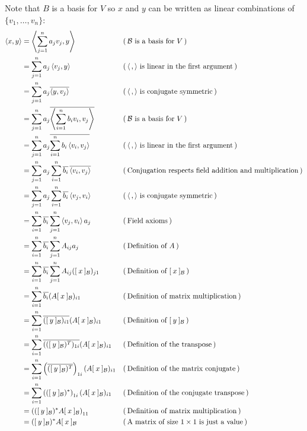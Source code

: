 \documentclass[fleqn]{article}
\newcommand{\evidence}[1]{\ensuremath{(\hspace{0.2em} \text{#1} \hspace{0.2em})}}
\newcommand{\coordsF}[2]{\ensuremath{[ \: #1 \: ]_{\mathcal{#2}}}}
\begin{document}
Note that $B$ is a basis for $V$ so $x$ and $y$ can be written as linear
combinations of $\{ v_1, \dots, v_n \}$:
\begin{align*}
  \langle x, y \rangle
  &= \left \langle \sum_{j=1}^n a_j v_j, y \right \rangle
  && \evidence{$\mathcal{B}$ is a basis for $V$} \\
  &= \sum_{j=1}^n a_j \left \langle v_j, y \right \rangle
  && \evidence{$\langle \, , \rangle$ is linear in the first argument} \\
  &= \sum_{j=1}^n a_j \overline{\left \langle y, v_j \right \rangle}
  && \evidence{$\langle \, , \rangle$ is conjugate symmetric} \\
  &= \sum_{j=1}^n a_j \overline{\left \langle \sum_{i=1}^n b_i v_i, v_j \right \rangle}
  && \evidence{$\mathcal{B}$ is a basis for $V$} \\
  &= \sum_{j=1}^n a_j \overline{\sum_{i=1}^n b_i \left \langle  v_i, v_j \right \rangle}
  && \evidence{$\langle \, , \rangle$ is linear in the first argument} \\
  &= \sum_{j=1}^n a_j \sum_{i=1}^n \overline{b_i} \, \overline{\left \langle  v_i, v_j \right \rangle}
  && \evidence{Conjugation respects field addition and multiplication} \\
  &= \sum_{j=1}^n a_j \sum_{i=1}^n \overline{b_i} \left \langle  v_j, v_i \right \rangle
  && \evidence{$\langle \, , \rangle$ is conjugate symmetric} \\
  &= \sum_{i=1}^n \overline{b_i} \sum_{j=1}^n \left \langle  v_j, v_i \right \rangle a_j
  && \evidence{Field axioms} \\
  &= \sum_{i=1}^n \overline{b_i} \sum_{j=1}^n A_{ij} a_j
  && \evidence{Definition of $A$} \\
  &= \sum_{i=1}^n \overline{b_i} \sum_{j=1}^n A_{ij} (\coordsF{x}{B})_{j1}
  && \evidence{Definition of $\coordsF{x}{B}$} \\
  &= \sum_{i=1}^n \overline{b_i} (A \coordsF{x}{B})_{i1}
  && \evidence{Definition of matrix multiplication} \\
  &= \sum_{i=1}^n \overline{(\coordsF{y}{B})_{i1}} (A \coordsF{x}{B})_{i1}
  && \evidence{Definition of $\coordsF{y}{B}$} \\
  &= \sum_{i=1}^n \overline{((\coordsF{y}{B})^T)_{1i}} (A \coordsF{x}{B})_{i1}
  && \evidence{Definition of the transpose} \\
  &= \sum_{i=1}^n \left (\overline{(\coordsF{y}{B})^T} \right )_{1i} (A \coordsF{x}{B})_{i1}
  && \evidence{Definition of the matrix conjugate} \\
  &= \sum_{i=1}^n \left ((\coordsF{y}{B})^* \right )_{1i} (A \coordsF{x}{B})_{i1}
  && \evidence{Definition of the conjugate transpose} \\
  &= \left ((\coordsF{y}{B})^* A \coordsF{x}{B}\right )_{11}
  && \evidence{Definition of matrix multiplication} \\
  &= (\coordsF{y}{B})^* A \coordsF{x}{B}
  && \evidence{A matrix of size $1\times 1$ is just a value}
\end{align*}
\end{document}
